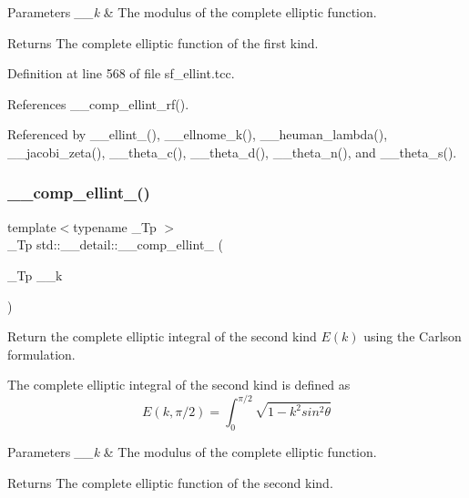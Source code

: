 \begin{DoxyParams}{Parameters}
{\em \+\_\+\+\_\+k} & The modulus of the complete elliptic function. \\
\hline
\end{DoxyParams}
\begin{DoxyReturn}{Returns}
The complete elliptic function of the first kind. 
\end{DoxyReturn}


Definition at line 568 of file sf\+\_\+ellint.\+tcc.



References \+\_\+\+\_\+comp\+\_\+ellint\+\_\+rf().



Referenced by \+\_\+\+\_\+ellint\+\_(), \+\_\+\+\_\+ellnome\+\_\+k(), \+\_\+\+\_\+heuman\+\_\+lambda(), \+\_\+\+\_\+jacobi\+\_\+zeta(), \+\_\+\+\_\+theta\+\_\+c(), \+\_\+\+\_\+theta\+\_\+d(), \+\_\+\+\_\+theta\+\_\+n(), and \+\_\+\+\_\+theta\+\_\+s().

\mbox{\label{namespacestd_1_1____detail_a4836f4db24abd037705100750f82d375}} 
\subsubsection{\texorpdfstring{\+\_\+\+\_\+comp\+\_\+ellint\+\_()}{\_\_comp\_ellint\_2()}}
{\footnotesize\ttfamily template$<$typename \+\_\+\+Tp $>$ \\
\+\_\+\+Tp std\+::\+\_\+\+\_\+detail\+::\+\_\+\+\_\+comp\+\_\+ellint\+\_ (\begin{DoxyParamCaption}\item[{\+\_\+\+Tp}]{\+\_\+\+\_\+k }\end{DoxyParamCaption})}



Return the complete elliptic integral of the second kind $ E(k) $ using the Carlson formulation. 

The complete elliptic integral of the second kind is defined as \[ E(k,\pi/2) = \int_0^{\pi/2}\sqrt{1 - k^2 sin^2\theta} \]


\begin{DoxyParams}{Parameters}
{\em \+\_\+\+\_\+k} & The modulus of the complete elliptic function. \\
\hline
\end{DoxyParams}
\begin{DoxyReturn}{Returns}
The complete elliptic function of the second kind. 
\end{DoxyReturn}


